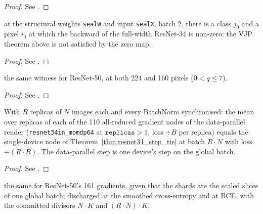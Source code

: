 \begin{proof}
\leanok
See .
\end{proof}

\begin{theorem}
  \label{thm:resnet34_seal}
  \leanok
  \Prove{} at the structural weights \texttt{sealW} and input
  \texttt{sealX}, batch 2, there is a class \(j_0\) and a pixel \(i_0\) at
  which the backward of the full-width ResNet-34 is non-zero: the VJP theorem
  above is not satisfied by the zero map.
\end{theorem}

\begin{proof}
\leanok
See .
\end{proof}

\begin{theorem}
  \label{thm:resnet50_seal}
  \leanok
  \Prove{} the same witness for ResNet-50, at both 224 and 160 pixels
  (\(0 < q \le 7\)).
\end{theorem}

\begin{proof}
\leanok
See .
\end{proof}

\begin{theorem}
  \label{thm:resnet34_sync_tie}
  \leanok
  With \(R\) replicas of \(N\) images each and every BatchNorm synchronised:
  \Prove{} the mean over replicas of each of the 110 all-reduced gradient nodes
  of the data-parallel render (\texttt{resnet34in\_momdp64} at
  \(\texttt{replicas} > 1\), loss \(\div B\) per replica) equals the
  single-device node of Theorem~\ref{thm:resnet34_step_tie} at batch
  \(R \cdot N\) with loss \(\div (R \cdot B)\). The data-parallel step is one
  device's step on the global batch.
\end{theorem}

\begin{proof}
\leanok
See .
\end{proof}

\begin{theorem}
  \label{thm:resnet50_sync_tie}
  \leanok
  \Prove{} the same for ResNet-50's 161 gradients, given that the shards are
  the scaled slices of one global batch; discharged at the smoothed
  cross-entropy and at BCE, with the committed divisors \(N \cdot K\) and
  \((R \cdot N) \cdot K\).
\end{theorem}

